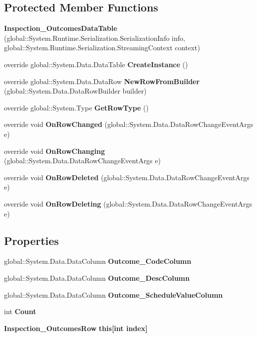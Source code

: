 \subsection*{Protected Member Functions}
\begin{DoxyCompactItemize}
\item 
\textbf{ Inspection\+\_\+\+Outcomes\+Data\+Table} (global\+::\+System.\+Runtime.\+Serialization.\+Serialization\+Info info, global\+::\+System.\+Runtime.\+Serialization.\+Streaming\+Context context)
\item 
override global\+::\+System.\+Data.\+Data\+Table \textbf{ Create\+Instance} ()
\item 
override global\+::\+System.\+Data.\+Data\+Row \textbf{ New\+Row\+From\+Builder} (global\+::\+System.\+Data.\+Data\+Row\+Builder builder)
\item 
override global\+::\+System.\+Type \textbf{ Get\+Row\+Type} ()
\item 
override void \textbf{ On\+Row\+Changed} (global\+::\+System.\+Data.\+Data\+Row\+Change\+Event\+Args e)
\item 
override void \textbf{ On\+Row\+Changing} (global\+::\+System.\+Data.\+Data\+Row\+Change\+Event\+Args e)
\item 
override void \textbf{ On\+Row\+Deleted} (global\+::\+System.\+Data.\+Data\+Row\+Change\+Event\+Args e)
\item 
override void \textbf{ On\+Row\+Deleting} (global\+::\+System.\+Data.\+Data\+Row\+Change\+Event\+Args e)
\end{DoxyCompactItemize}
\subsection*{Properties}
\begin{DoxyCompactItemize}
\item 
global\+::\+System.\+Data.\+Data\+Column \textbf{ Outcome\+\_\+\+Code\+Column}\hspace{0.3cm}{\ttfamily  [get]}
\item 
global\+::\+System.\+Data.\+Data\+Column \textbf{ Outcome\+\_\+\+Desc\+Column}\hspace{0.3cm}{\ttfamily  [get]}
\item 
global\+::\+System.\+Data.\+Data\+Column \textbf{ Outcome\+\_\+\+Schedule\+Value\+Column}\hspace{0.3cm}{\ttfamily  [get]}
\item 
int \textbf{ Count}\hspace{0.3cm}{\ttfamily  [get]}
\item 
\textbf{ Inspection\+\_\+\+Outcomes\+Row} \textbf{ this[int index]}\hspace{0.3cm}{\ttfamily  [get]}
\end{DoxyCompactItemize}
